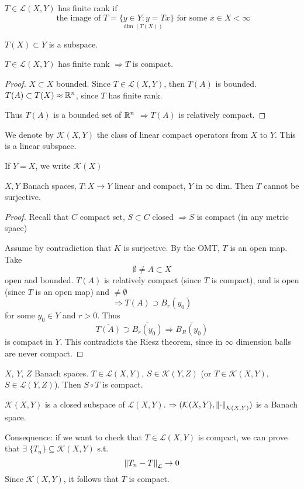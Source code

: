 \begin{definition}
    \(T \in \mathcal{L}(X, Y)\) has finite rank if 
    \[
        \underset{\dim (T(X))}{\text{ the image of }T= \{y \in Y: y = Tx\} \text{ for some } x \in X} < \infty
    \]
\end{definition}
\(T(X) \subset Y\) is a subspace.
\begin{proposition}
    \(T \in \mathcal{L}(X, Y)\) has finite rank \(\Rightarrow T\) is compact.
\end{proposition}
\begin{proof}
    \(X \subset X \) bounded. Since \(T \in \mathcal{L}(X, Y)\), then \(T(A)\) is bounded. \(T(A) \subset T(X) \approx \mathbb{R}^n\), since \(T\) has finite rank. 
    
    Thus \(T(A)\) is a bounded set of \(\mathbb{R}^n\) \(\Rightarrow T(A) \) is relatively compact. 
\end{proof}

\begin{definition}
    We denote by \(\mathcal{K}(X, Y)\) the class of linear compact operators from \(X \) to \(Y\). This is a linear subspace.

    If \(Y=X\), we write \(\mathcal{K}(X)\)
\end{definition}
\begin{proposition}
    \(X, Y\) Banach spaces, \(T:X \to Y\) linear and compact, \(Y\) in \(\infty\) dim. Then \(T\) cannot be surjective.
\end{proposition}
\begin{proof}
    Recall that \(C\) compact set, \(S \subset C\) closed \(\Rightarrow S\) is compact (in any metric space)

    Assume by contradiction that \(K\) is surjective. By the OMT, \(T\) is an open map. Take 
    \[
        \emptyset \neq A \subset X
    \]
    open and bounded. \(T(A)\) is relatively compact (since \(T\) is compact), and is open (since \(T\) is an open map) 
    and \(\neq \emptyset\)
    \[
        \Rightarrow T(A) \supset B_r(y_0)
    \]
    for some \(y_0 \in Y \) and \(r>0\). Thus 
    \[
        \overline{T(A)} \supset \overline{B_r(y_0)} \Rightarrow \overline{B_R(y_0)} 
    \] 
    is compact in \(Y\). This contradicts the Riesz theorem, since in \(\infty\) dimension balls are never compact. 
\end{proof}

\begin{proposition}
    \(X\), \(Y\), \(Z\) Banach spaces. \(T \in \mathcal{L}(X, Y)\), \(S \in \mathcal{K}(Y, Z)\) (or \(T \in \mathcal{K}(X, Y)\), \(S \in \mathcal{L}(Y, Z)\)). Then \(S \circ T\) is compact.
\end{proposition}
\begin{theorem}
    \(\mathcal{K}(X, Y) \) is a closed subspace of \(\mathcal{L}(X, Y)\). \(\Rightarrow (\mathcal{K}(X, Y), \norm{\cdot}_{\mathcal{K}(X, Y)})\) is a Banach space.
\end{theorem}
Consequence: if we want to check that \(T \in \mathcal{L}(X, Y)\) is compact, we can prove that \(\exists\; \{T_n\} \subseteq \mathcal{K}(X, Y)\) s.t. 
\[
    \norm{T_n - T}_{\mathcal{L}} \to 0
\]
Since \(\mathcal{K}(X, Y)\), it follows that \(T\) is compact.